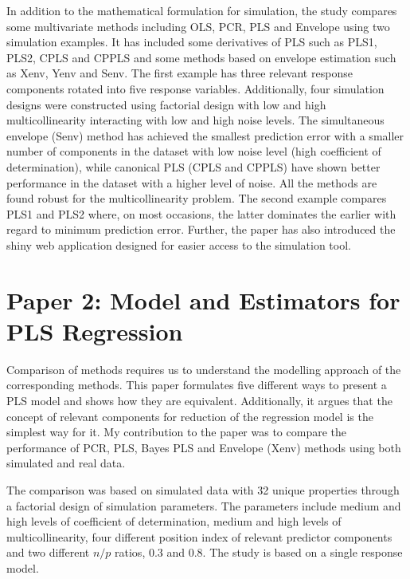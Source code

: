 \documentclass[11pt,twoside,openright,titlepage,
  headinclude,footinclude,BCOR=5mm,
  numbers=noenddot,cleardoublepage=empty,
  tablecaptionabove, dottedtoc,
  bibliography=totoc,paper=a4]{scrreprt}
\begin{document}
In addition to the mathematical formulation for simulation, the study compares some multivariate methods including OLS, PCR, PLS and Envelope using two simulation examples. It has included some derivatives of PLS such as PLS1, PLS2, CPLS and CPPLS and some methods based on envelope estimation such as Xenv, Yenv and Senv. The first example has three relevant response components rotated into five response variables. Additionally, four simulation designs were constructed using factorial design with low and high multicollinearity interacting with low and high noise levels. The simultaneous envelope (Senv) method has achieved the smallest prediction error with a smaller number of components in the dataset with low noise level (high coefficient of determination), while canonical PLS (CPLS and CPPLS) have shown better performance in the dataset with a higher level of noise. All the methods are found robust for the multicollinearity problem. The second example compares PLS1 and PLS2 where, on most occasions, the latter dominates the earlier with regard to minimum prediction error. Further, the paper has also introduced the shiny \citep{shiny} web application designed for easier access to the simulation tool.

\hypertarget{paper-2-model-and-estimators-for-pls-regression}{%
\section{Paper 2: Model and Estimators for PLS Regression}\label{paper-2-model-and-estimators-for-pls-regression}}

Comparison of methods requires us to understand the modelling approach of the corresponding methods. This paper formulates five different ways to present a PLS model \citep{helland1990partial} and shows how they are equivalent. Additionally, it argues that the concept of relevant components for reduction of the regression model is the simplest way for it. My contribution to the paper was to compare the performance of PCR, PLS, Bayes PLS and Envelope (Xenv) methods using both simulated and real data.

The comparison was based on simulated data with 32 unique properties through a factorial design of simulation parameters. The parameters include medium and high levels of coefficient of determination, medium and high levels of multicollinearity, four different position index of relevant predictor components and two different \(n/p\) ratios, 0.3 and 0.8. The study is based on a single response model.
\end{document}
